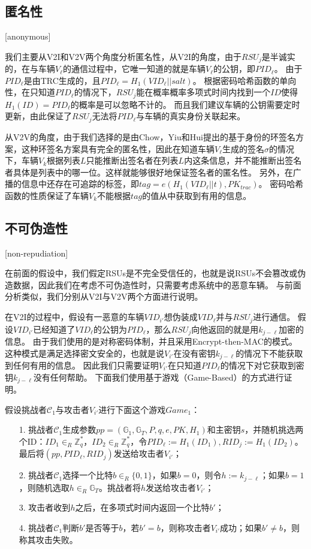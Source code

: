 \subsection{匿名性}[anonymous]

我们主要从V2I和V2V两个角度分析匿名性，从V2I的角度，由于$RSU_j$是半诚实的，在与车辆$V_\ell$的通信过程中，它唯一知道的就是车辆$V_\ell$的公钥，即$PID_\ell$。
由于$PID_\ell$是由TRC生成的，且$PID_\ell=H_1(VID_\ell||salt)$。
根据密码哈希函数的单向性，在只知道$PID_\ell$的情况下，$RSU_j$能在概率概率多项式时间内找到一个$ID$使得$H_1(ID)=PID_\ell$的概率是可以忽略不计的。
而且我们建议车辆的公钥需要定时更新，由此保证了$RSU_j$无法将$PID_\ell$与车辆的真实身份关联起来。

从V2V的角度，由于我们选择的是由Chow，Yiu和Hui提出的基于身份的环签名方案，这种环签名方案具有完全的匿名性，因此在知道车辆$V_\ell$生成的签名$\sigma$的情况下，车辆$V_k$根据列表$L$只能推断出签名者在列表$L$内这条信息，并不能推断出签名者具体是列表中的哪一位。这样就能够很好地保证签名者的匿名性。
另外，在广播的信息中还存在可追踪的标签，即$tag=e(H_1(VID_\ell||t),PK_{trac})$。
密码哈希函数的性质保证了车辆$V_k$不能根据$tag$的值从中获取到有用的信息。

\subsection{不可伪造性}[non-repudiation]

在前面的假设中，我们假定RSUs是不完全受信任的，也就是说RSUs不会篡改或伪造数据，因此我们在考虑不可伪造性时，只需要考虑系统中的恶意车辆。
与前面分析类似，我们分别从V2I与V2V两个方面进行说明。

在V2I的过程中，假设有一恶意的车辆$VID_{i'}$想伪装成$VID_\ell$并与$RSU_j$进行通信。
假设$VID_{i'}$已经知道了$VID_\ell$的公钥为$PID_\ell$，那么$RSU_j$向他返回的就是用$k_{j-\ell}$加密的信息。
由于我们使用的是对称密码体制，并且采用Encrypt-then-MAC的模式。
这种模式是满足选择密文安全的，也就是说$V_{i'}$在没有密钥$k_{j-\ell}$的情况下不能获取到任何有用的信息。
因此我们只需要证明$V_{i'}$在只知道$PID_\ell$的情况下对它获取到密钥$k_{j-\ell}$没有任何帮助。
下面我们使用基于游戏（Game-Based）的方式进行证明。

假设挑战者$\mathcal{C}_1$与攻击者$V_{i'}$进行下面这个游戏$Game_1$：
\begin{itemize}
  \item[1.] 挑战者$\mathcal{C}_1$生成参数$pp=(\mathbb{G}_1,\mathbb{G}_T,P,q,e,PK,H_1)$和主密钥$s$，并随机挑选两个ID：$ID_1\in_R\mathbb{Z}_q^*$，$ID_2\in_R\mathbb{Z}_q^*$，令$PID_\ell:=H_1(ID_1),RID_j:=H_1(ID_2)$。最后将$(pp,PID_\ell,RID_j)$发送给攻击者$V_{i'}$；
  \item[2.] 挑战者$\mathcal{C}_1$选择一个比特$b\in_R\{0,1\}$，如果$b=0$，则令$h:=k_{j-\ell}$；如果$b=1$，则随机选取$h\in_R\mathbb{G}_T$。挑战者将$h$发送给攻击者$V_{i'}$；
  \item[3.] 攻击者收到$h$之后，在多项式时间内返回一个比特$b'$；
  \item[4.] 挑战者$\mathcal{C}_1$判断$b'$是否等于$b$，若$b'=b$，则称攻击者$V_{i'}$成功；如果$b'\neq b$，则称其攻击失败。
\end{itemize}

